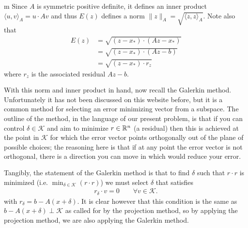 \documentclass[11pt]{article}
\begin{document}
\begin{my proof}{m}
Since $A$ is symmetric positive definite, it defines an inner product $\langle u,v\rangle_A = u \cdot A v$ and thus $E(z)$ defines a norm $\lVert z \rVert_A = \sqrt{\langle z, z \rangle_A}$. Note also that \begin{align*}
E(z) &= \sqrt{(z - x_*) \cdot (Az - x_*)} \\
 &= \sqrt{(z - x_*) \cdot (Az - b)} \\
 &= \sqrt{(z - x_*) \cdot r_z}
\end{align*}
where $r_z$ is the associated residual $Az - b$.

With this norm and inner product in hand, now recall the Galerkin method. Unfortunately it has not been discussed on this website before, but it is a common method for selecting an error minimizing vector from a subspace. The outline of the method, in the language of our present problem, is that if you can control $\delta \in \mathcal K$ and aim to minimize $r \in \mathbb{R}^n$ (a residual) then this is achieved at the point in $\mathcal{K}$ for which the error vector points orthogonally out of the plane of possible choices; the reasoning here is that if at any point the error vector is not orthogonal, there is a direction you can move in which would reduce your error.

Tangibly, the statement of the Galerkin method is that to find $\delta$ such that $r \cdot r$ is minimized (i.e. $\min_{\delta \in \mathcal{K}} (r \cdot r)$) we must select $\delta$ that satisfies \begin{gather*}
r_\delta \cdot v = 0 \hspace{2em} \forall v \in \mathcal{K}.
\end{gather*}
with $r_\delta = b - A(x + \delta)$. It is clear however that this condition is the same as $b - A(x + \delta) \perp \mathcal{K}$ as called for by the projection method, so by applying the projection method, we are also applying the Galerkin method.


\end{my proof}
\end{document}
